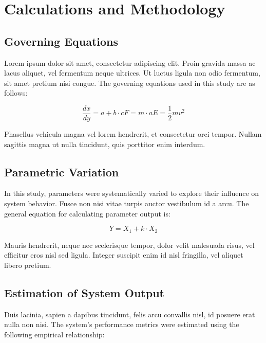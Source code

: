 \chapter{Calculations and Methodology}

\fancyfoot[C]{\thepage}

\section{Governing Equations}
Lorem ipsum dolor sit amet, consectetur adipiscing elit. Proin gravida massa ac lacus aliquet, vel fermentum neque ultrices. Ut luctus ligula non odio fermentum, sit amet pretium nisi congue. The governing equations used in this study are as follows:

\begin{subequations}
    \begin{equation}\label{eq: dummy_mass}
        \frac{dx}{dy} = a + b \cdot c
    \end{equation}
    \begin{equation}\label{eq: dummy_momentum}
        F = m \cdot a
    \end{equation}
    \begin{equation}\label{eq: dummy_energy}
        E = \frac{1}{2} m v^2
    \end{equation}
\end{subequations}

Phasellus vehicula magna vel lorem hendrerit, et consectetur orci tempor. Nullam sagittis magna ut nulla tincidunt, quis porttitor enim interdum.

\section{Parametric Variation}
In this study, parameters were systematically varied to explore their influence on system behavior. Fusce non nisi vitae turpis auctor vestibulum id a arcu. The general equation for calculating parameter output is:

\begin{equation}\label{eq: dummy_parametric}
    Y = X_1 + k \cdot X_2
\end{equation}

Mauris hendrerit, neque nec scelerisque tempor, dolor velit malesuada risus, vel efficitur eros nisl sed ligula. Integer suscipit enim id nisl fringilla, vel aliquet libero pretium.

\section{Estimation of System Output}
Duis lacinia, sapien a dapibus tincidunt, felis arcu convallis nisl, id posuere erat nulla non nisi. The system's performance metrics were estimated using the following empirical relationship:


